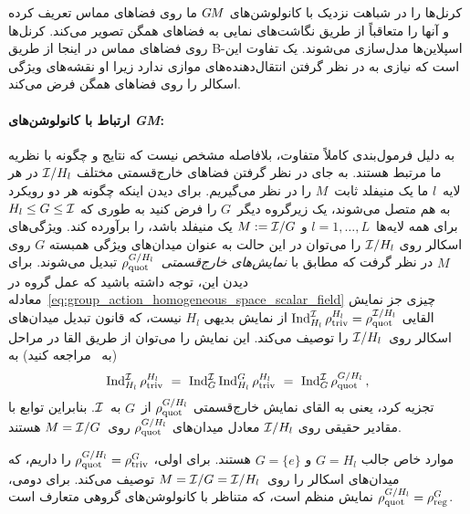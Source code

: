 \citet{bekkers2020bspline} کرنل‌ها را در شباهت نزدیک با کانولوشن‌های $G\mkern-1.4muM$ ما روی فضاهای مماس تعریف کرده و آنها را متعاقباً از طریق نگاشت‌های نمایی به فضاهای همگن تصویر می‌کند.
کرنل‌ها روی فضاهای مماس در اینجا از طریق B-اسپلاین‌ها مدل‌سازی می‌شوند.
یک تفاوت این است که \citet{bekkers2020bspline} نیازی به در نظر گرفتن انتقال‌دهنده‌های موازی ندارد زیرا او نقشه‌های ویژگی اسکالر را روی فضاهای همگن فرض می‌کند.





\paragraph{ارتباط با کانولوشن‌های \emph{GM}:}

به دلیل فرمول‌بندی کاملاً متفاوت، بلافاصله مشخص نیست که نتایج \citet{Kondor2018-GENERAL} و \citet{bekkers2020bspline} چگونه با نظریه ما مرتبط هستند.
به جای در نظر گرفتن فضاهای خارج‌قسمتی مختلف $\mathcal{I}/H_l$ در هر لایه~$l$ ما یک منیفلد ثابت~$M$ را در نظر می‌گیریم.
برای دیدن اینکه چگونه هر دو رویکرد به هم متصل می‌شوند، یک زیرگروه دیگر~$G$ را فرض کنید به طوری که $H_l \leq G \leq \mathcal{I}$ برای همه لایه‌ها~$l=1,\dots,L$ و $M := \mathcal{I}/G$ یک منیفلد باشد، را برآورده کند.
ویژگی‌های اسکالر روی $\mathcal{I}/H_l$ را می‌توان در این حالت به عنوان میدان‌های ویژگی همبسته $G$ روی $M$ در نظر گرفت که مطابق با \emph{نمایش‌های خارج‌قسمتی}~$\rho_\textup{quot}^{G/H_l}$ تبدیل می‌شوند.
برای دیدن این، توجه داشته باشید که عمل گروه در معادله~\eqref{eq:group_action_homogeneous_space_scalar_field} چیزی جز نمایش القایی $\operatorname{Ind}_{H_l}^{\mathcal{I}} \rho_\textup{triv}^{H_l} = \rho_\textup{quot}^{\mathcal{I}/H_l}$ از نمایش بدیهی $H_l$ نیست، که قانون تبدیل میدان‌های اسکالر روی~$\mathcal{I}/H_l$ را توصیف می‌کند.
این نمایش را می‌توان از طریق القا در مراحل (به~\cite{ceccherini2009induced} مراجعه کنید) به
\begin{align}
	\operatorname{Ind}_{H_l}^{\mathcal{I}} \rho_\textup{triv}^{H_l}
	\ =\ \operatorname{Ind}_G^{\mathcal{I}} \operatorname{Ind}_{H_l}^G \rho_\textup{triv}^{H_l}
	\ =\ \operatorname{Ind}_G^{\mathcal{I}} \rho_\textup{quot}^{G/H_l} \,,
\end{align}
تجزیه کرد، یعنی به القای نمایش خارج‌قسمتی $\rho_\textup{quot}^{G/H_l}$ از~$G$ به~$\mathcal{I}$.
بنابراین توابع با مقادیر حقیقی روی $\mathcal{I}/H_l$ معادل میدان‌های $\rho_\textup{quot}^{G/H_l}$ روی~$M=\mathcal{I}/G$ هستند.


موارد خاص جالب $G=H_l$ و $G=\{e\}$ هستند.
برای اولی، $\rho_\textup{quot}^{G/H_l} = \rho_\textup{triv}^G$ را داریم، که میدان‌های اسکالر را روی~$M = \mathcal{I}/G = \mathcal{I}/H_l$ توصیف می‌کند.
برای دومی، $\rho_\textup{quot}^{G/H_l} = \rho_\textup{reg}^G$ نمایش منظم است، که متناظر با کانولوشن‌های گروهی متعارف است.


